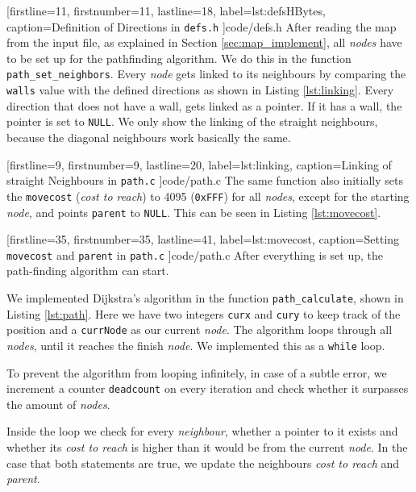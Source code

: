 
[firstline=11,			%
firstnumber=11,			%
lastline=18,			%
label=lst:defsHBytes,	%
caption={Definition of Directions in {\tt defs.h}}
]{code/defs.h}
%
After reading the map from the input file,
as explained in Section \ref{sec:map_implement}, 
all \emph{nodes} have to be set up for the pathfinding algorithm.
We do this in the function {\tt path\_set\_neighbors}.
Every \emph{node} gets linked to its neighbours by comparing the {\tt walls} value
with the defined directions as shown in Listing \ref{lst:linking}.
Every direction that does not have a wall,
gets linked as a pointer.
If it has a wall, the pointer is set to {\tt NULL}.
We only show the linking of the straight neighbours,
because the diagonal neighbours work basically the same.


[firstline=9,			%
firstnumber=9,
lastline=20,			%
label=lst:linking,		%
caption={Linking of straight Neighbours in {\tt path.c}}
]{code/path.c}
%
The same function also initially sets the {\tt movecost}
(\emph{cost to reach}) to 4095 ({\tt 0xFFF}) for all \emph{nodes},
except for the starting \emph{node},
and points {\tt parent} to {\tt NULL}.
This can be seen in Listing \ref{lst:movecost}.


[firstline=35,			%
firstnumber=35,
lastline=41,			%
label=lst:movecost,	%
caption={Setting {\tt movecost} and {\tt parent} in {\tt path.c}}
]{code/path.c}
%
After everything is set up,
the path-finding algorithm can start.

We implemented Dijkstra's algorithm in the function {\tt path\_calculate},
shown in Listing \ref{lst:path}.
Here we have two integers {\tt curx} and {\tt cury} to keep track of the position
and a {\tt currNode} as our current \emph{node}.
The algorithm loops through all \emph{nodes},
until it reaches the finish \emph{node}.
We implemented this as a {\tt while} loop.

To prevent the algorithm from looping infinitely,
in case of a subtle error,
we increment a counter {\tt deadcount} on every iteration
and check whether it surpasses the amount of \emph{nodes}.

Inside the loop we check for every \emph{neighbour},
whether a pointer to it exists
and whether its \emph{cost to reach} is higher than it would be from the current \emph{node}.
In the case that both statements are true,
we update  the neighbours \emph{cost to reach}
and \emph{parent}.

